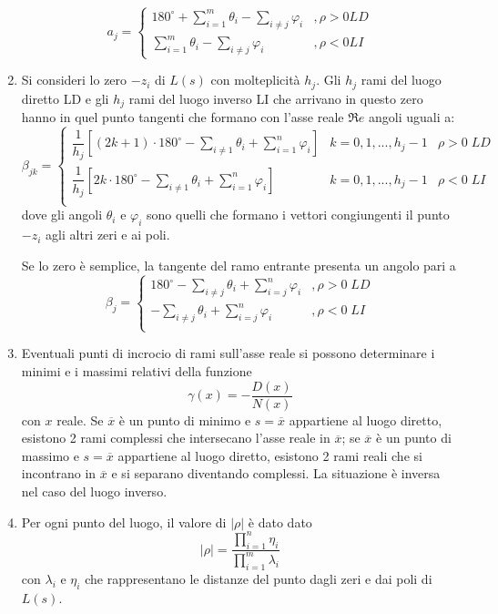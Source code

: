\documentclass[a4paper]{report}
\begin{document}
\begin{enumerate}
  \[
  a_j =
  \left \{
  \begin{array}{ll}
    180^{\circ} + \sum\limits_{i = 1}^{m} \theta_i - \sum\limits_{i \neq j}
    \varphi_i &, \rho > 0 LD\\
    \sum\limits_{i = 1}^{m} \theta_i - \sum\limits_{i \neq j} \varphi_i &, \rho < 0 LI
  \end{array}
    \right .
  \]
\item Si consideri lo zero $-z_i$ di $L(s)$ con molteplicit\`a
  $h_j$. Gli $h_j$ rami del luogo diretto LD e gli $h_j$ rami del
  luogo inverso LI che arrivano in questo zero hanno in quel punto
  tangenti che formano con l'asse reale $\mathfrak{R}e$ angoli uguali
  a:
  \[
  \beta_{jk} =
  \left\{
  \begin{array}{lll}
    \dfrac{1}{h_j}\left[ (2k + 1)\cdot 180^{\circ} - \sum\limits_{i
        \neq 1} \theta_i + \sum\limits_{i=1}^{n}\varphi_i \right] & k
    = 0, 1, ..., h_j - 1 & \rho > 0\;LD\\
    \dfrac{1}{h_j}\left[ 2k\cdot 180^{\circ} - \sum\limits_{i
        \neq 1} \theta_i + \sum\limits_{i=1}^{n}\varphi_i \right] & k
    = 0, 1, ..., h_j - 1 & \rho < 0\;LI\\
  \end{array}
  \right .
  \]
  dove gli angoli $\theta_i$ e $\varphi_i$ sono quelli che formano i
  vettori congiungenti il punto $-z_i$ agli altri zeri e ai poli.

  Se lo zero \`e semplice, la tangente del ramo entrante presenta un
  angolo pari a
  \[
  \beta_j =
  \left\{
  \begin{array}{ll}
  180^{\circ} - \sum\limits_{i \neq j}\theta_i + \sum\limits_{i = j}^n
  \varphi_i &, \rho > 0 \; LD\\
  - \sum\limits_{i \neq j}\theta_i + \sum\limits_{i = j}^n
  \varphi_i &, \rho < 0 \; LI\\
  \end{array}
  \right .
  \]
\item Eventuali punti di incrocio di rami sull'asse reale si possono
  determinare i minimi e i massimi relativi della funzione
  \[
  \gamma(x) = -\dfrac{D(x)}{N(x)}
  \]
  con $x$ reale. Se $\overline{x}$ \`e un punto di minimo e $s =
  \overline{x}$ appartiene al luogo diretto, esistono 2 rami complessi
  che intersecano l'asse reale in $\overline{x}$; se $\overline{x}$
  \`e un punto di massimo e $s = \overline{x}$ appartiene al luogo
  diretto, esistono 2 rami reali che si incontrano in $\overline{x}$ e
  si separano diventando complessi. La situazione \`e inversa nel caso
  del luogo inverso.
\item Per ogni punto del luogo, il valore di $|\rho|$ \`e dato dato
  \[
  |\rho| = \dfrac{\prod\limits_{i = 1}^{n} \eta_i}{\prod\limits_{i =
      1}^{m}\lambda_i} 
  \]
  con $\lambda_i$ e $\eta_i$ che rappresentano le distanze del punto
  dagli zeri e dai poli di $L(s)$.
\end{enumerate}
\end{document}
